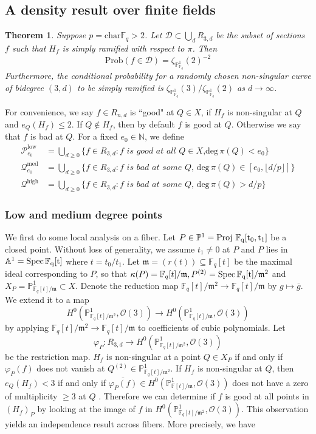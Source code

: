 \documentclass[12pt]{article}
\theoremstyle{plain}
\newtheorem{theorem}[equation]{Theorem}
\theoremstyle{definition}
\newcommand{\fm}{\mathfrak{m}}
\newcommand{\IA}{\mathbb{A}}
\newcommand{\IN}{\mathbb{N}}
\newcommand{\IF}{\mathbb{F}}
\newcommand{\IP}{\mathbb{P}}
\newcommand{\sD}{\mathcal{D}}
\newcommand{\sO}{\mathcal{O}}
\newcommand{\sP}{\mathcal{P}}
\newcommand{\sQ}{\mathcal{Q}}
\renewcommand{\deg}{\mathrm{deg}\,}
\newcommand{\Spec}{\rm Spec\,}
\newcommand{\Proj}{\rm Proj\,}
\newcommand\union{\bigcup}
\newcommand\wb{\overline}
\newcommand{\<}{\langle}
\renewcommand{\>}{\rangle}
\newcommand{\Prob}{\mathrm{Prob}}
\begin{document}
\subsection{A density result over finite fields}
\begin{theorem}
\label{main}
Suppose $p = \mathrm{char } \IF_q > 2$. Let $\sD \subset \union_d R_{3,d}$ be the subset of sections $f$ such that $H_f$ is simply ramified with respect to $\pi$. Then
$$ \Prob(f \in \sD) = \zeta_{\IP^1_{\IF_q}}(2)^{-2} $$ Furthermore, the conditional probability for a randomly chosen non-singular curve of bidegree $(3, d)$ to be simply ramified is $\zeta_{\IP^1_{\IF_q}}(3)/\zeta_{\IP^1_{\IF_q}}(2)$ as $d \to \infty$. 
\end{theorem}
For convenience, we say $f \in R_{n, d}$ is ``good" at $Q \in X$, if $H_f$ is non-singular at $Q$ and $e_Q(H_f) \le 2$. If $Q \not\in H_f$, then by default $f$ is good at $Q$. Otherwise we say that $f$ is bad at $Q$. For a fixed $e_0 \in \IN$, we define 
\begin{align*}
\sP_{e_0}^{\mathrm{low}} &= \union_{d \ge 0} \{ f \in R_{3, d} : f \textit{ is good at all $Q \in X$,}\deg \pi(Q) < e_0\}\\
\sQ_{e_0}^{\mathrm{med}} &= \union_{d \ge 0} \{f \in R_{3, d} : f \textit{ is bad at some $Q$, }\deg \pi(Q) \in [e_0, \lfloor d/p \rfloor]\}\\
\sQ^{\mathrm{high}} &= \union_{d \ge 0} \{f \in R_{3, d} : f \textit{ is bad at some $Q$, }\deg \pi(Q) > d/p\}
\end{align*}
\subsubsection{Low and medium degree points}
We first do some local analysis on a fiber. Let $P \in \IP^1 = \Proj \, \IF_q[t_0, t_1]$ be a closed point. Without loss of generality, we assume $t_1 \neq 0$ at $P$ and $P$ lies in $\IA^1 = \Spec \IF_q[t]$ where $t = t_0/t_1$.   Let $\fm = (r(t))\subseteq \IF_q[t]$ be the maximal ideal corresponding to $P$, so that $\kappa(P) = \IF_q[t]/\fm, P^{(2)} = \Spec \IF_q[t]/\fm^2$ and $X_P = \IP^1_{\IF_q[t]/\fm} \subset X$. Denote the reduction map $\IF_q[t]/\fm^2 \to \IF_q[t]/\fm$ by $g \mapsto \overline{g}$. We extend it to a map $$ H^0(\IP^1_{\IF_q[t]/\fm^2}, \sO(3)) \to H^0(\IP^1_{\IF_q[t]/\fm}, \sO(3))$$ by applying $\IF_q[t]/\fm^2 \to \IF_q[t]/\fm$ to coefficients of cubic polynomials. Let $$\varphi_P : R_{3, d} \to H^0(\IP^1_{\IF_q[t]/\fm^2}, \sO(3))$$ be the restriction map. $H_f$ is non-singular at a point $Q \in X_P$ if and only if $\varphi_P(f)$ does not vanish at $Q^{(2)} \in \IP^1_{\IF_q[t]/\fm^2}$. If $H_f$ is non-singular at $Q$, then $e_Q(H_f) < 3$ if and only if $\wb{\varphi_P(f)} \in H^0(\IP^1_{\IF[t]/\fm}, \sO(3))$ does not have a zero of multiplicity $\ge 3$ at $Q$ . Therefore we can determine if $f$ is good at all points in $(H_f)_P$ by looking at the image of $f$ in $H^0(\IP^1_{\IF_q[t]/\fm^2}, \sO(3))$. This observation yields an independence result across fibers. More precisely, we have 
\end{document}
